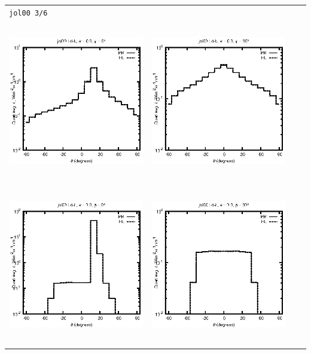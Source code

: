\begin{tabular}{c c c c}
\multicolumn{4}{l}{\texttt{jol00 3/6}} \\
\includegraphics[height=7cm]{../eps/jol00_Ld_b_fwd.eps} &
\includegraphics[height=7cm]{../eps/jol00_Ld_b_cross.eps} \\
\includegraphics[height=7cm]{../eps/jol00_Ld_it_fwd.eps} &
\includegraphics[height=7cm]{../eps/jol00_Ld_it_cross.eps} \\

\end{tabular}
